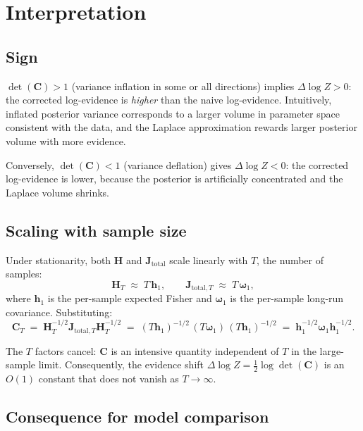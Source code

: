 \documentclass[11pt]{article}
\begin{document}
\section{Interpretation}

\subsection{Sign}

$\det(\mathbf C) > 1$ (variance inflation in some or all directions) implies $\Delta\log Z > 0$: the corrected log-evidence is \emph{higher} than the naive log-evidence. Intuitively, inflated posterior variance corresponds to a larger volume in parameter space consistent with the data, and the Laplace approximation rewards larger posterior volume with more evidence.

Conversely, $\det(\mathbf C) < 1$ (variance deflation) gives $\Delta\log Z < 0$: the corrected log-evidence is lower, because the posterior is artificially concentrated and the Laplace volume shrinks.

\subsection{Scaling with sample size}

Under stationarity, both $\mathbf H$ and $\mathbf J_{\mathrm{total}}$ scale linearly with $T$, the number of samples:
\begin{equation}
\mathbf H_T \;\approx\; T\,\mathbf h_1,
\qquad
\mathbf J_{\mathrm{total},T} \;\approx\; T\,\boldsymbol\omega_1,
\end{equation}
where $\mathbf h_1$ is the per-sample expected Fisher and $\boldsymbol\omega_1$ is the per-sample long-run covariance. Substituting:
\begin{equation}
\mathbf C_T
\;=\;
\mathbf H_T^{-1/2}\mathbf J_{\mathrm{total},T}\mathbf H_T^{-1/2}
\;=\;
(T\mathbf h_1)^{-1/2}\,(T\boldsymbol\omega_1)\,(T\mathbf h_1)^{-1/2}
\;=\;
\mathbf h_1^{-1/2}\boldsymbol\omega_1\mathbf h_1^{-1/2}.
\end{equation}

The $T$ factors cancel: $\mathbf C$ is an intensive quantity independent of $T$ in the large-sample limit. Consequently, the evidence shift $\Delta\log Z = \tfrac{1}{2}\log\det(\mathbf C)$ is an $O(1)$ constant that does not vanish as $T\to\infty$.

\subsection{Consequence for model comparison}
\end{document}

